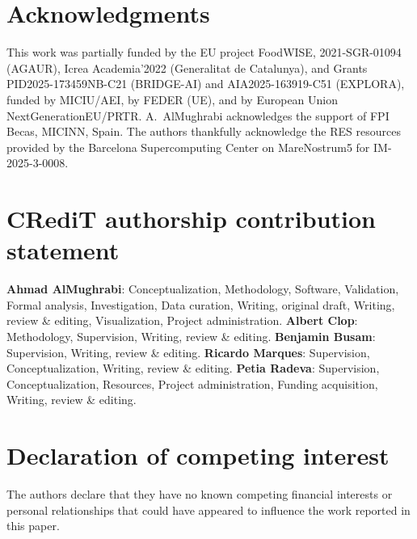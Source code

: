 \documentclass[a4paper,fleqn]{cas-dc}
\begin{document}








\section*{Acknowledgments}
This work was partially funded by the EU project FoodWISE,
2021-SGR-01094 (AGAUR), Icrea Academia'2022 (Generalitat de Catalunya),
and Grants PID2025-173459NB-C21 (BRIDGE-AI) and AIA2025-163919-C51
(EXPLORA), funded by MICIU/AEI, by FEDER (UE), and by European Union
NextGenerationEU/PRTR. A.~AlMughrabi acknowledges the support of FPI
Becas, MICINN, Spain. The authors thankfully acknowledge the RES
resources provided by the Barcelona Supercomputing Center on
MareNostrum5 for IM-2025-3-0008.

\section*{CRediT authorship contribution statement}
\textbf{Ahmad AlMughrabi}: Conceptualization, Methodology, Software,
Validation, Formal analysis, Investigation, Data curation, Writing,
original draft, Writing, review \& editing, Visualization, Project
administration.
\textbf{Albert Clop}: Methodology, Supervision, Writing, review \& editing.
\textbf{Benjamin Busam}: Supervision, Writing, review \& editing.
\textbf{Ricardo Marques}: Supervision, Conceptualization, Writing,
review \& editing.
\textbf{Petia Radeva}: Supervision, Conceptualization, Resources,
Project administration, Funding acquisition, Writing, review \&
editing.

\section*{Declaration of competing interest}
The authors declare that they have no known competing financial interests or
personal relationships that could have appeared to influence the work
reported in this paper.
\end{document}
